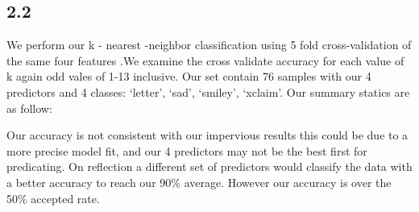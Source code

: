 \documentclass[
]{article}
\begin{document}
\hypertarget{section-3}{%
\subsection{2.2}\label{section-3}}

We perform our k - nearest -neighbor classification using 5 fold
cross-validation of the same four features .We examine the cross
validate accuracy for each value of k again odd vales of 1-13 inclusive.
Our set contain 76 samples with our 4 predictors and 4 classes:
`letter', `sad', `smiley', `xclaim'. Our summary statics are as follow:

Our accuracy is not consistent with our impervious results this could be
due to a more precise model fit, and our 4 predictors may not be the
best first for predicating. On reflection a different set of predictors
would classify the data with a better accuracy to reach our 90\%
average. However our accuracy is over the 50\% accepted rate.
\end{document}
